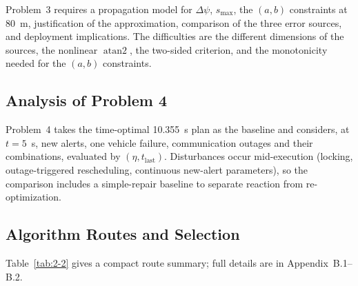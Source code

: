Problem~3 requires a propagation model for $\Delta\psi$, $s_{\max}$, the $(a,b)$ constraints at 80~m, justification of the approximation, comparison of the three error sources, and deployment implications. The difficulties are the different dimensions of the sources, the nonlinear $\operatorname{atan2}$, the two-sided criterion, and the monotonicity needed for the $(a,b)$ constraints.

\subsection{Analysis of Problem 4}

Problem~4 takes the time-optimal 10.355~s plan as the baseline and considers, at $t=5$~s, new alerts, one vehicle failure, communication outages and their combinations, evaluated by $(\eta,t_{\mathrm{last}})$. Disturbances occur mid-execution (locking, outage-triggered rescheduling, continuous new-alert parameters), so the comparison includes a simple-repair baseline to separate reaction from re-optimization.

\subsection{Algorithm Routes and Selection}

Table~\ref{tab:2-2} gives a compact route summary; full details are in Appendix~B.1--B.2.

